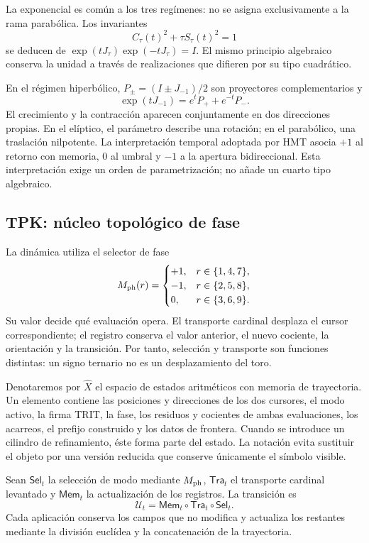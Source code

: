 La exponencial es común a los tres regímenes: no se asigna exclusivamente a la rama parabólica. Los invariantes
\[
 C_\tau(t)^2+\tau S_\tau(t)^2=1
\]
se deducen de \(\exp(tJ_\tau)\exp(-tJ_\tau)=I\). El mismo principio algebraico conserva la unidad a través de realizaciones que difieren por su tipo cuadrático.

En el régimen hiperbólico, \(P_\pm=(I\pm J_{-1})/2\) son proyectores complementarios y
\[
 \exp(tJ_{-1})=e^tP_++e^{-t}P_-.
\]
El crecimiento y la contracción aparecen conjuntamente en dos direcciones propias. En el elíptico, el parámetro describe una rotación; en el parabólico, una traslación nilpotente. La interpretación temporal adoptada por HMT asocia \(+1\) al retorno con memoria, \(0\) al umbral y \(-1\) a la apertura bidireccional. Esta interpretación exige un orden de parametrización; no añade un cuarto tipo algebraico.





\newpage
\subsection{TPK: núcleo topológico de fase}

La dinámica utiliza el selector de fase
\[
 M_{\rm ph}(r)=
 \begin{cases}
 +1,&r\in\{1,4,7\},\\
 -1,&r\in\{2,5,8\},\\
 0,&r\in\{3,6,9\}.
 \end{cases}
\]
Su valor decide qué evaluación opera. El transporte cardinal desplaza el cursor correspondiente; el registro conserva el valor anterior, el nuevo cociente, la orientación y la transición. Por tanto, selección y transporte son funciones distintas: un signo ternario no es un desplazamiento del toro.

Denotaremos por \(\widehat X\) el espacio de estados aritméticos con memoria de trayectoria. Un elemento contiene las posiciones y direcciones de los dos cursores, el modo activo, la firma TRIT, la fase, los residuos y cocientes de ambas evaluaciones, los acarreos, el prefijo construido y los datos de frontera. Cuando se introduce un cilindro de refinamiento, éste forma parte del estado. La notación evita sustituir el objeto por una versión reducida que conserve únicamente el símbolo visible.

\begin{definition}
Sean \(\mathsf{Sel}_t\) la selección de modo mediante \(M_{\rm ph}\), \(\mathsf{Tra}_t\) el transporte cardinal levantado y \(\mathsf{Mem}_t\) la actualización de los registros. La transición es
\begin{equation}
 \mathcal U_t=\mathsf{Mem}_t\circ\mathsf{Tra}_t\circ\mathsf{Sel}_t.
 \label{eq:actualizacion}
\end{equation}
Cada aplicación conserva los campos que no modifica y actualiza los restantes mediante la división euclídea y la concatenación de la trayectoria.
\end{definition}

